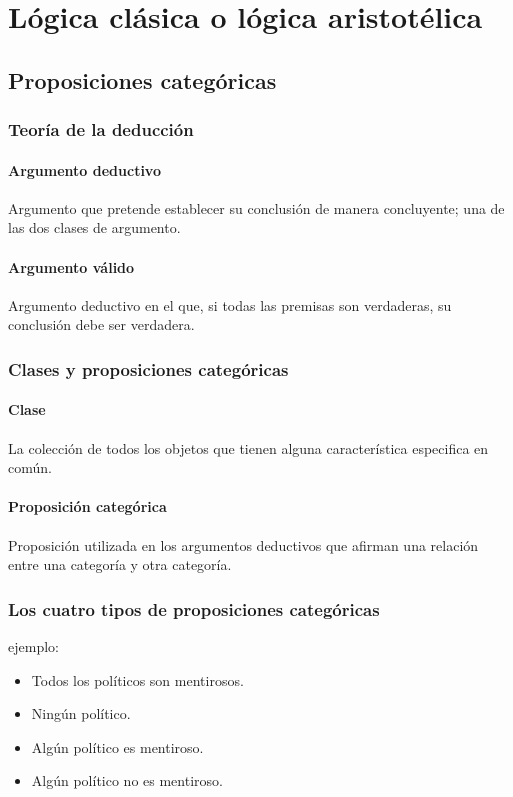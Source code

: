 \documentclass[10pt]{book} 						%
\begin{document}
\chapter{Lógica clásica o lógica aristotélica}
\section{Proposiciones categóricas}
\subsection{Teoría de la deducción}
\subsubsection{Argumento deductivo}
Argumento que pretende establecer su conclusión de manera concluyente; una de las dos clases de argumento.

\subsubsection{Argumento válido}
Argumento deductivo en el que, si todas las premisas son verdaderas, su conclusión debe ser verdadera.

\subsection{Clases y proposiciones categóricas}
\subsubsection{Clase}
La colección de todos los objetos que tienen alguna característica especifica en común.
\subsubsection{Proposición categórica}
Proposición utilizada en los argumentos deductivos que afirman una relación entre una categoría y otra categoría.
\subsection{Los cuatro tipos de proposiciones categóricas}
ejemplo:
\begin{itemize}
\item Todos los políticos son mentirosos.
\item Ningún político.
\item Algún político es mentiroso.
\item Algún político no es mentiroso.
\end{itemize}
\end{document}
